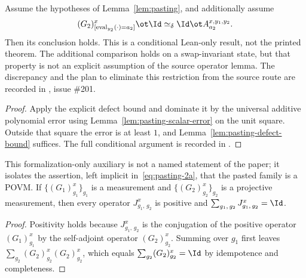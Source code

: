 \begin{lemma}
	\label{lem:pasting-of-register-exchange}
	\leanok
	Assume the hypotheses of Lemma~\ref{lem:pasting}, and additionally assume
	\begin{equation}\label{eq:pasting-1-sym}
		(G_2)^x_{[\operatorname{eval}_{y_2}(\cdot)=a_2]} \ot \Id
		\simeq_\delta \Id \ot A^{x,y_1,y_2}_{a_2}.
	\end{equation}
	Then its conclusion holds. This is a conditional Lean-only result, not the
	printed theorem. The additional comparison holds on a swap-invariant state,
	but that property is not an explicit assumption of the source operator lemma.
	The discrepancy and the plan to eliminate this restriction from the source
	route are recorded in \cite{gap:qpbt_pasting-product-error}, issue \#201.
\end{lemma}
\begin{proof}
	\leanok
	Apply the explicit defect bound and dominate it by the universal additive
	polynomial error using Lemma~\ref{lem:pasting-scalar-error} on the unit
	square. Outside that square the error is at least $1$, and
	Lemma~\ref{lem:pasting-defect-bound} suffices.
	The full conditional argument is recorded in
	\cite{gap:qpbt_pasting-product-error}.
\end{proof}

\begin{lemma}
	\label{lem:pasting-measurement}
	\leanok
	This formalization-only auxiliary is not a named statement of the paper; it
	isolates the assertion, left implicit in~\eqref{eq:pasting-2a}, that the
	pasted family is a POVM. If $\{(G_1)^x_{g_1}\}_{g_1}$ is a measurement and
	$\{(G_2)^x_{g_2}\}_{g_2}$ is a projective measurement, then every operator
	$J^x_{g_1,\,g_2}$ is positive and
	$\sum_{g_1,\,g_2} J^x_{g_1,\,g_2} = \Id$.
\end{lemma}
\begin{proof}
	\leanok {}
	Positivity holds because $J^x_{g_1,\,g_2}$ is the conjugation of the
	positive operator $(G_1)^x_{g_1}$ by the self-adjoint operator
	$(G_2)^x_{g_2}$. Summing over $g_1$ first leaves
	$\sum_{g_2} (G_2)^x_{g_2} (G_2)^x_{g_2}$, which equals
	$\sum_{g_2} (G_2)^x_{g_2} = \Id$ by idempotence and completeness.
\end{proof}

